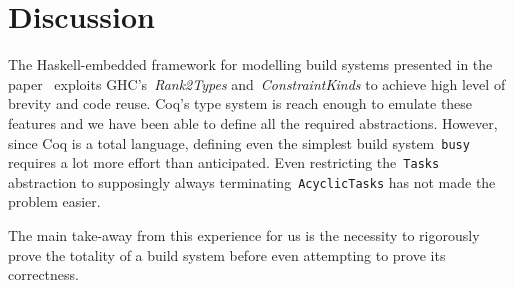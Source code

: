 \documentclass[sigplan,review]{acmart}\settopmatter{printfolios=true,printccs=false,printacmref=false}
\newcommand{\hs}{\texttt}
\begin{document}
\vspace{-3mm}
\section{Discussion}\label{sec-discussion}
\vspace{-1mm}

The Haskell-embedded framework for modelling build systems presented in the
paper~\cite{Mokhov2018icfp} exploits GHC's~\emph{Rank2Types}
and~\emph{ConstraintKinds} to achieve high level of brevity and code reuse.
Coq's type system is reach enough to emulate these features and we have been able
to define all the required abstractions. However, since Coq is a total language,
defining even the simplest build system~\hs{busy} requires a lot more
effort than anticipated. Even restricting the~\hs{Tasks} abstraction to
supposingly always terminating~\hs{AcyclicTasks} has not made the problem easier.

The main take-away from this experience for us is the necessity to rigorously
prove the totality of a build system before even attempting to prove its correctness.







\end{document}
